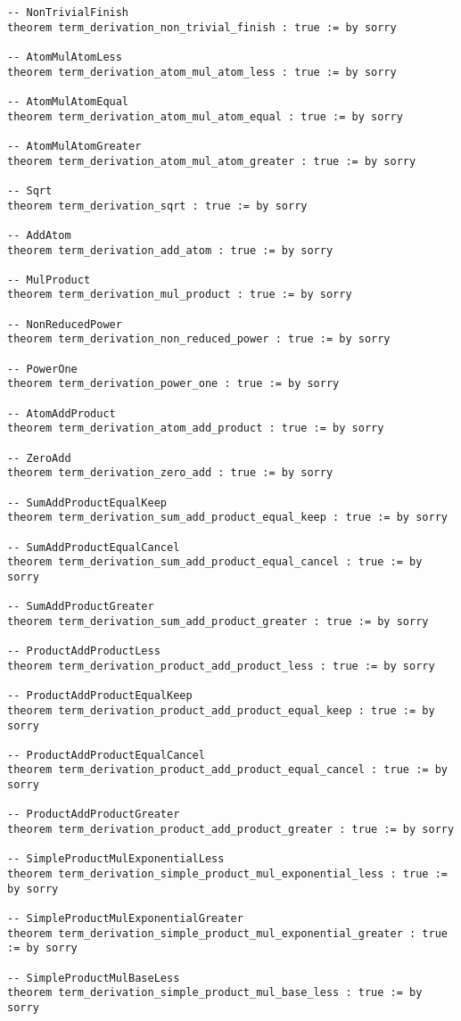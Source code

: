 \documentclass{article}
\begin{document}
\begin{tcolorbox}[colback=white!10, width=\linewidth]
\begin{lstlisting}[language=Lean4]
-- NonTrivialFinish
theorem term_derivation_non_trivial_finish : true := by sorry

-- AtomMulAtomLess
theorem term_derivation_atom_mul_atom_less : true := by sorry

-- AtomMulAtomEqual
theorem term_derivation_atom_mul_atom_equal : true := by sorry

-- AtomMulAtomGreater
theorem term_derivation_atom_mul_atom_greater : true := by sorry

-- Sqrt
theorem term_derivation_sqrt : true := by sorry

-- AddAtom
theorem term_derivation_add_atom : true := by sorry

-- MulProduct
theorem term_derivation_mul_product : true := by sorry

-- NonReducedPower
theorem term_derivation_non_reduced_power : true := by sorry

-- PowerOne
theorem term_derivation_power_one : true := by sorry

-- AtomAddProduct
theorem term_derivation_atom_add_product : true := by sorry

-- ZeroAdd
theorem term_derivation_zero_add : true := by sorry

-- SumAddProductEqualKeep
theorem term_derivation_sum_add_product_equal_keep : true := by sorry

-- SumAddProductEqualCancel
theorem term_derivation_sum_add_product_equal_cancel : true := by sorry

-- SumAddProductGreater
theorem term_derivation_sum_add_product_greater : true := by sorry

-- ProductAddProductLess
theorem term_derivation_product_add_product_less : true := by sorry

-- ProductAddProductEqualKeep
theorem term_derivation_product_add_product_equal_keep : true := by sorry

-- ProductAddProductEqualCancel
theorem term_derivation_product_add_product_equal_cancel : true := by sorry

-- ProductAddProductGreater
theorem term_derivation_product_add_product_greater : true := by sorry

-- SimpleProductMulExponentialLess
theorem term_derivation_simple_product_mul_exponential_less : true := by sorry

-- SimpleProductMulExponentialGreater
theorem term_derivation_simple_product_mul_exponential_greater : true := by sorry

-- SimpleProductMulBaseLess
theorem term_derivation_simple_product_mul_base_less : true := by sorry


\end{lstlisting}
\end{tcolorbox}
\end{document}
